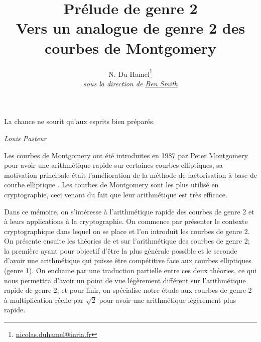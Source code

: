 \documentclass[a4paper,12pt]{article}
\theoremstyle{definition}
\theoremstyle{remark}
\numberwithin{equation}{section}
\begin{document}
\title{Prélude de genre 2 \\ \large{Vers un analogue de genre 2 des courbes de Montgomery}}
\author{N. Du Hamel\footnote{\href{mailto:nicolas.duhamel@inria.fr}{nicolas.duhamel@inria.fr}} \\
\emph{sous la direction de \href{http://www.lix.polytechnique.fr/~smith/}{Ben Smith}}}
\maketitle



\epigraph{La chance ne sourit qu'aux esprits bien préparés.}{\textit{Louis Pasteur}}

Les courbes de Montgomery ont été introduites en 1987 par Peter Montgomery pour avoir une arithmétique rapide sur certaines courbes elliptiques, sa motivation principale était l'amélioration de la méthode de factorisation à base de courbe elliptique \citep{montgomery}. Les courbes de Montgomery sont les plus utilisé en cryptographie, ceci venant du fait que leur arithmétique est très efficace.

Dans ce mémoire, on s'intéresse à l'arithmétique rapide des courbes de genre 2 et à leurs applications à la cryptographie. On commence par présenter le contexte cryptographique dans lequel on se place et l'on introduit les courbes de genre 2. On présente ensuite les théories de \citet{cassels-Flynn} et \citet{gaudry} sur l'arithmétique des courbes de genre 2; la première ayant pour objectif d'être la plus générale possible et le seconde d'avoir une arithmétique qui puisse être compétitive face aux courbes elliptiques (genre 1).
On enchaine par une traduction partielle entre ces deux théories, ce qui nous permettra d'avoir un point de vue légèrement différent sur l'arithmétique rapide de genre 2; et pour finir, on spécialise notre étude aux courbes de genre 2 à multiplication réelle par $\sqrt{2}$ pour avoir une arithmétique légèrement plus rapide.
\end{document}
